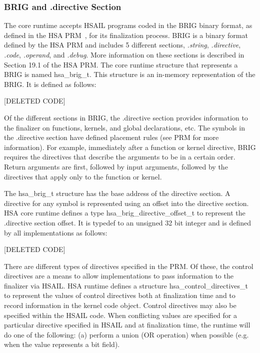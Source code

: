 \documentclass[draft]{book}
\newcommand{\reftyp}[1]{#1}
\begin{document}
\subsubsection{BRIG and .directive Section}
The core runtime accepts HSAIL programs coded in the BRIG binary format, as
defined in the HSA PRM~\cite{prm}, for its finalization process. BRIG is a
binary format defined by the HSA PRM and includes 5 different sections,
\emph{.string}, \emph{.directive}, \emph{.code}, \emph{.operand}, and
\emph{.debug}. More information on these sections is described in Section 19.1
of the HSA PRM. The core runtime structure that represents a BRIG is named
\reftyp{hsa_brig_t}. This structure is an in-memory representation of the
BRIG. It is defined as follows:

[DELETED CODE]

Of the different sections in BRIG, the .directive section provides information
to the finalizer on functions, kernels, and global declarations, etc. The
symbols in the .directive section have defined placement rules (see PRM for more
information). For example, immediately after a function or kernel directive,
BRIG requires the directives that describe the arguments to be in a certain
order. Return arguments are first, followed by input arguments, followed by the
directives that apply only to the function or kernel.

The \reftyp{hsa_brig_t} structure has the base address of the directive
section. A directive for any symbol is represented using an offset into the
directive section. HSA core runtime defines a type
\reftyp{hsa_brig_directive_offset_t} to represent the .directive section
offset. It is typedef to an unsigned 32 bit integer and is defined by all
implementations as follows:

[DELETED CODE]

There are different types of directives specified in the PRM. Of these, the
control directives are a means to allow implementations to pass information to
the finalizer via HSAIL. HSA runtime defines a structure
\reftyp{hsa_control_directives_t} to represent the values of control
directives both at finalization time and to record information in the kernel
code object. Control directives may also be specified within the HSAIL
code. When conflicting values are specified for a particular directive specified
in HSAIL and at finalization time, the runtime will do one of the following: (a)
perform a union (OR operation) when possible (e.g. when the value represents a
bit field).
\end{document}
